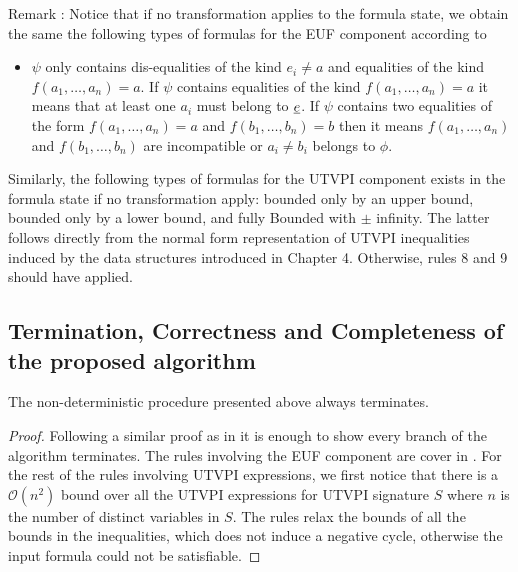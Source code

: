 Remark \label{my_remark}: Notice that if no transformation applies to the formula state, we obtain the same 
the following types of formulas for the EUF component according to \cite{ghilardi2020compactly} 

\begin{itemize}
  \item $\psi$ only contains dis-equalities of the kind $e_i \neq a$ and equalities of
    the kind $f(a_1, \dots, a_n) = a$. If $\psi$ contains equalities of the
    kind $f(a_1, \dots, a_n) = a$ it means that at least one $a_i$ must belong
    to $\underline{e}$. If $\psi$ contains two equalities of the form
    $f(a_1, \dots, a_n) = a$ and $f(b_1, \dots, b_n) = b$ then it means
    $f(a_1, \dots, a_n)$ and $f(b_1, \dots, b_n)$ are incompatible or $a_i \neq b_i$
    belongs to $\phi$.
\end{itemize}

Similarly, the following types of formulas for the UTVPI component exists in the
formula state if no transformation apply: bounded only by an upper bound, 
bounded only by a lower bound, and fully Bounded with $\pm$ infinity. The
latter follows directly from the normal form representation of UTVPI inequalities
induced by the data structures introduced in Chapter 4. Otherwise, rules
8 and 9 should have applied.

\subsection{Termination, Correctness and Completeness of the
proposed algorithm}

\begin{lemma}
  The non-deterministic procedure presented above 
  always terminates.
\end{lemma}

\begin{proof}
  Following a similar proof as in \cite{ghilardi2020compactly}
  it is enough to show every branch of the algorithm terminates.
  The rules involving the EUF component are cover in
  \cite{ghilardi2020compactly}. For the rest of the rules
  involving UTVPI expressions, we first notice that there is a 
  $\mathcal{O}(n^2)$ bound over all the UTVPI expressions
  for UTVPI signature $S$ where $n$ is the number of distinct
  variables in $S$. The rules relax the bounds of all the
  bounds in the inequalities, which does not induce a negative
  cycle, otherwise the input formula could not be satisfiable.
\end{proof} 

